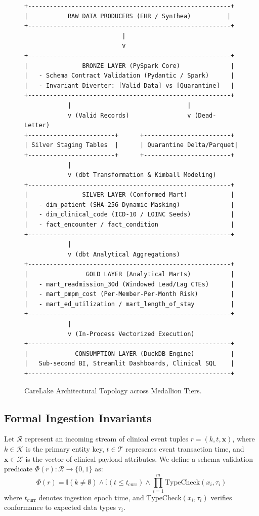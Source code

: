 \documentclass[10pt,journal,compsoc]{IEEEtran}
\begin{document}
\begin{figure}[!t]
\centering
\begin{lstlisting}
+--------------------------------------------------------+
|           RAW DATA PRODUCERS (EHR / Synthea)          |
+--------------------------------------------------------+
                           |
                           v
+--------------------------------------------------------+
|               BRONZE LAYER (PySpark Core)              |
|   - Schema Contract Validation (Pydantic / Spark)      |
|   - Invariant Diverter: [Valid Data] vs [Quarantine]   |
+--------------------------------------------------------+
            |                                |
            v (Valid Records)                v (Dead-Letter)
+------------------------+      +------------------------+
| Silver Staging Tables  |      | Quarantine Delta/Parquet|
+------------------------+      +------------------------+
            |
            v (dbt Transformation & Kimball Modeling)
+--------------------------------------------------------+
|               SILVER LAYER (Conformed Mart)            |
|   - dim_patient (SHA-256 Dynamic Masking)              |
|   - dim_clinical_code (ICD-10 / LOINC Seeds)           |
|   - fact_encounter / fact_condition                    |
+--------------------------------------------------------+
            |
            v (dbt Analytical Aggregations)
+--------------------------------------------------------+
|                GOLD LAYER (Analytical Marts)           |
|   - mart_readmission_30d (Windowed Lead/Lag CTEs)      |
|   - mart_pmpm_cost (Per-Member-Per-Month Risk)         |
|   - mart_ed_utilization / mart_length_of_stay          |
+--------------------------------------------------------+
            |
            v (In-Process Vectorized Execution)
+--------------------------------------------------------+
|             CONSUMPTION LAYER (DuckDB Engine)          |
|   Sub-second BI, Streamlit Dashboards, Clinical SQL    |
+--------------------------------------------------------+
\end{lstlisting}
\caption{CareLake Architectural Topology across Medallion Tiers.}
\label{fig:architecture}
\end{figure}

\subsection{Formal Ingestion Invariants}
Let $\mathcal{R}$ represent an incoming stream of clinical event tuples $r = (k, t, \mathbf{x})$, where $k \in \mathcal{K}$ is the primary entity key, $t \in \mathcal{T}$ represents event transaction time, and $\mathbf{x} \in \mathcal{X}$ is the vector of clinical payload attributes. We define a schema validation predicate $\Phi(r): \mathcal{R} \to \{0, 1\}$ as:
\begin{equation}
\Phi(r) = \mathbb{I}(k \neq \emptyset) \land \mathbb{I}(t \le t_{\text{curr}}) \land \prod_{i=1}^{m} \text{TypeCheck}(x_i, \tau_i)
\end{equation}
where $t_{\text{curr}}$ denotes ingestion epoch time, and $\text{TypeCheck}(x_i, \tau_i)$ verifies conformance to expected data types $\tau_i$.
\end{document}
